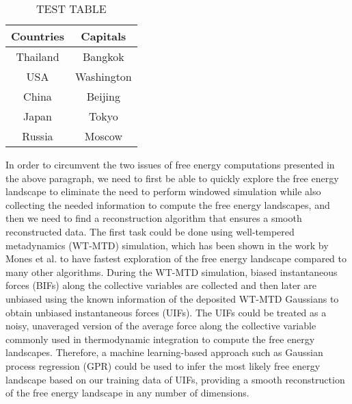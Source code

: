 \begin{spacing}{2.0}
    \begin{table}[H]
        \centering
        \caption{TEST TABLE}
        \begin{tabular}{|c|c|}
            \hline
            Countries & Capitals \\ \hline
            Thailand & Bangkok \\
            USA & Washington \\
            China & Beijing \\
            Japan & Tokyo \\
            Russia & Moscow \\ \hline
        \end{tabular}
    \end{table}

    In order to circumvent the two issues of free energy computations presented in the above paragraph, we need to first be able to quickly explore 
    the free energy landscape to eliminate the need to perform windowed simulation while also collecting the needed information to compute the free 
    energy landscapes, and then we need to find a reconstruction algorithm that ensures a smooth reconstructed data. The first task could be done 
    using well-tempered metadynamics (WT-MTD) simulation, which has been shown in the work by Mones et al. to have fastest exploration of the free 
    energy landscape compared to many other algorithms. \cite{P-JCTC-2016-v12-Mones} During the WT-MTD simulation, biased instantaneous forces (BIFs) 
    along the collective variables are collected and then later are unbiased using the known information of the deposited WT-MTD Gaussians to obtain 
    unbiased instantaneous forces (UIFs). The UIFs could be treated as a noisy, unaveraged version of the average force along the collective variable 
    commonly used in thermodynamic integration to compute the free energy landscapes. Therefore, a machine learning-based approach such as Gaussian 
    process regression (GPR) could be used to infer the most likely free energy landscape based on our training data of UIFs, providing a smooth 
    reconstruction of the free energy landscape in any number of dimensions. \cite{P-JCTC-2014-v10-Stecher, P-JCTC-2016-v12-Mones}

\end{spacing}
